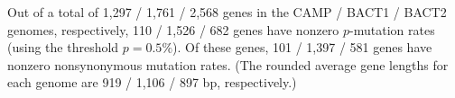 Out of a total of 1,297 / 1,761 / 2,568 genes in the CAMP / BACT1 / BACT2 genomes, respectively, 110 / 1,526 / 682 genes have nonzero $p$-mutation rates (using the threshold $p=0.5\%$). Of these genes, 101 / 1,397 / 581 genes have nonzero nonsynonymous mutation rates. (The rounded average gene lengths for each genome are 919 / 1,106 / 897 bp, respectively.)\endinput